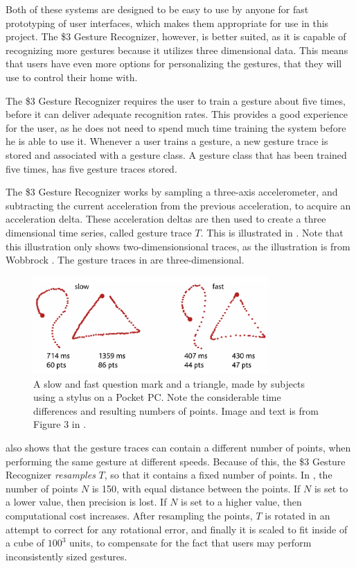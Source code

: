 Both of these systems are designed to be easy to use by anyone for fast prototyping of user interfaces, 
which makes them appropriate for use in this project.
The \$3 Gesture Recognizer, however, is better suited, 
as it is capable of recognizing more gestures because it utilizes three dimensional data.
This means that users have even more options for personalizing the gestures, 
that they will use to control their home with.

The \$3 Gesture Recognizer requires the user to train a gesture about five times, 
before it can deliver adequate recognition rates. 
This provides a good experience for the user, 
as he does not need to spend much time training the system before he is able to use it.
Whenever a user trains a gesture, 
a new gesture trace is stored and associated with a gesture class. 
A gesture class that has been trained five times, 
has five gesture traces stored.

The \$3 Gesture Recognizer works by sampling a three-axis accelerometer, 
and subtracting the current acceleration from the previous acceleration, 
to acquire an acceleration delta.
These acceleration deltas are then used to create a three dimensional time series, 
called gesture trace $T$.
This is illustrated in . 
Note that this illustration only shows two-dimensionsional traces, 
as the illustration is from Wobbrock \etal \cite{wobbrock2007gestures}.
The gesture traces in \cite{threedollar} are three-dimensional. 

\begin{figure}[!htb]
	\centering
	\includegraphics[width=0.8\textwidth]{images/1-dollar-gesturetrace.png}
	\caption{A slow and fast question mark and a triangle, made by subjects using a stylus on a Pocket PC. Note the considerable time differences and resulting numbers of points. Image and text is from Figure 3 in \protect\cite{wobbrock2007gestures}.}
	\label{fig:onedollar-gesturetrace}
\end{figure}

 also shows that the gesture traces can contain a different number of points, 
when performing the same gesture at different speeds.
Because of this, the \$3 Gesture Recognizer \emph{resamples} $T$, 
so that it contains a fixed number of points. 
In \cite{threedollar}, the number of points $N$ is \num{150}, 
with equal distance between the points.
If $N$ is set to a lower value, then precision is lost. 
If $N$ is set to a higher value, then computational cost increases.
After resampling the points, 
$T$ is rotated in an attempt to correct for any rotational error, 
and finally it is scaled to fit inside of a cube of $100^3$ units, 
to compensate for the fact that users may perform inconsistently sized gestures.


